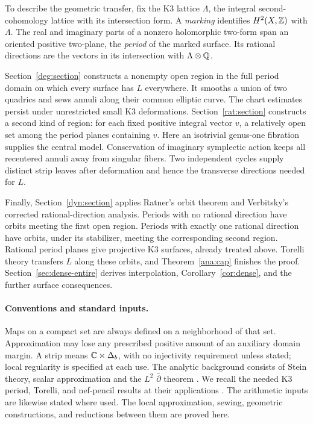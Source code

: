 To describe the geometric transfer, fix the K3 lattice $\Lambda$,
the integral second-cohomology lattice with its intersection form.
A \emph{marking} identifies $H^2(X,\mathbb Z)$ with $\Lambda$. The real
and imaginary parts of a nonzero holomorphic two-form span an
oriented positive two-plane, the \emph{period} of the marked surface.
Its rational directions are the vectors in its intersection with
$\Lambda\otimes\mathbb Q$.

Section~\ref{deg:section} constructs a nonempty open region in the
full period domain on which every surface has $L$ everywhere. It
smooths a union of two quadrics and sews annuli along their common
elliptic curve. The chart estimates persist under unrestricted small
K3 deformations. Section~\ref{rat:section} constructs a second kind
of region: for each fixed positive integral vector $v$, a relatively
open set among the period planes containing $v$. Here an isotrivial
genus-one fibration supplies the central model. Conservation of
imaginary symplectic action keeps all recentered annuli away from
singular fibers. Two independent cycles supply distinct strip leaves
after deformation and hence the transverse directions needed for $L$.

Finally, Section~\ref{dyn:section} applies Ratner's orbit theorem and
Verbitsky's corrected rational-direction analysis. Periods with no
rational direction have orbits meeting the first open region. Periods
with exactly one rational direction have orbits, under its stabilizer,
meeting the corresponding second region. Rational period planes give
projective K3 surfaces, already treated above. Torelli theory
transfers $L$ along these orbits, and Theorem~\ref{ana:cap} finishes
the proof. Section~\ref{sec:dense-entire} derives interpolation,
Corollary~\ref{cor:dense}, and the further surface consequences.

\paragraph{Conventions and standard inputs.}
Maps on a compact set are always defined on a neighborhood of that set.
Approximation may lose any prescribed positive amount of an auxiliary
domain margin. A strip means $\mathbb C\times\Delta_b$, with no injectivity
requirement unless stated; local regularity is specified at each use.
The analytic background consists of Stein theory, scalar approximation
and the $L^2$ $\bar\partial$ theorem
\cite{Forstneric,Hormander,Siu}. We recall the needed K3 period,
Torelli, and nef-pencil results at their applications
\cite[Chapters~2, 6--8, and~11]{Huybrechts}. The arithmetic inputs
are likewise stated where used. The local approximation, sewing,
geometric constructions, and reductions between them are proved here.

